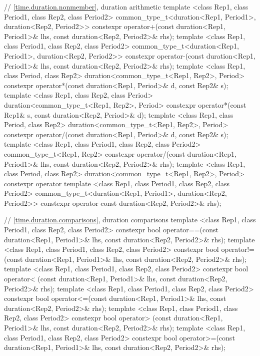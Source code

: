\begin{codeblock}
{{    // \ref{time.duration.nonmember}, duration arithmetic
    template <class Rep1, class Period1, class Rep2, class Period2>
      common_type_t<duration<Rep1, Period1>, duration<Rep2, Period2>>
      constexpr operator+(const duration<Rep1, Period1>& lhs,
                          const duration<Rep2, Period2>& rhs);
    template <class Rep1, class Period1, class Rep2, class Period2>
      common_type_t<duration<Rep1, Period1>, duration<Rep2, Period2>>
      constexpr operator-(const duration<Rep1, Period1>& lhs,
                          const duration<Rep2, Period2>& rhs);
    template <class Rep1, class Period, class Rep2>
      duration<common_type_t<Rep1, Rep2>, Period>
      constexpr operator*(const duration<Rep1, Period>& d, const Rep2& s);
    template <class Rep1, class Rep2, class Period>
      duration<common_type_t<Rep1, Rep2>, Period>
      constexpr operator*(const Rep1& s, const duration<Rep2, Period>& d);
    template <class Rep1, class Period, class Rep2>
      duration<common_type_t<Rep1, Rep2>, Period>
      constexpr operator/(const duration<Rep1, Period>& d, const Rep2& s);
    template <class Rep1, class Period1, class Rep2, class Period2>
      common_type_t<Rep1, Rep2>
      constexpr operator/(const duration<Rep1, Period1>& lhs,
                          const duration<Rep2, Period2>& rhs);
    template <class Rep1, class Period, class Rep2>
      duration<common_type_t<Rep1, Rep2>, Period>
      constexpr operator%
    template <class Rep1, class Period1, class Rep2, class Period2>
      common_type_t<duration<Rep1, Period1>, duration<Rep2, Period2>>
      constexpr operator%
                          const duration<Rep2, Period2>& rhs);

    // \ref{time.duration.comparisons}, duration comparisons
    template <class Rep1, class Period1, class Rep2, class Period2>
      constexpr bool operator==(const duration<Rep1, Period1>& lhs,
                                const duration<Rep2, Period2>& rhs);
    template <class Rep1, class Period1, class Rep2, class Period2>
      constexpr bool operator!=(const duration<Rep1, Period1>& lhs,
                                const duration<Rep2, Period2>& rhs);
    template <class Rep1, class Period1, class Rep2, class Period2>
      constexpr bool operator< (const duration<Rep1, Period1>& lhs,
                                const duration<Rep2, Period2>& rhs);
    template <class Rep1, class Period1, class Rep2, class Period2>
      constexpr bool operator<=(const duration<Rep1, Period1>& lhs,
                                const duration<Rep2, Period2>& rhs);
    template <class Rep1, class Period1, class Rep2, class Period2>
      constexpr bool operator> (const duration<Rep1, Period1>& lhs,
                                const duration<Rep2, Period2>& rhs);
    template <class Rep1, class Period1, class Rep2, class Period2>
      constexpr bool operator>=(const duration<Rep1, Period1>& lhs,
                                const duration<Rep2, Period2>& rhs);

}}
\end{codeblock}
